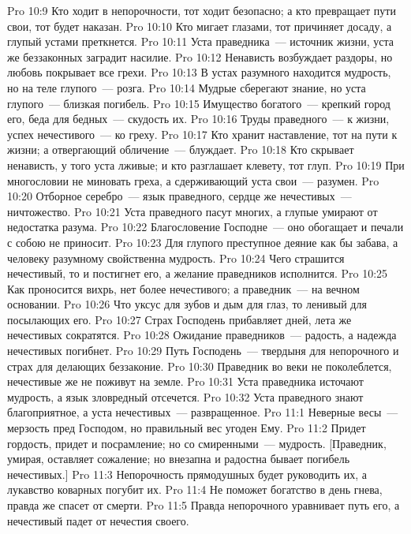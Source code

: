 \vs Pro 10:9 Кто ходит в непорочности, тот ходит безопасно; а кто превращает пути свои, тот будет наказан.
\vs Pro 10:10 Кто мигает глазами, тот причиняет досаду, а глупый устами преткнется.
\vs Pro 10:11 Уста праведника~--- источник жизни, уста же беззаконных заградит насилие.
\vs Pro 10:12 Ненависть возбуждает раздоры, но любовь покрывает все грехи.
\vs Pro 10:13 В устах разумного находится мудрость, но на теле глупого~--- розга.
\vs Pro 10:14 Мудрые сберегают знание, но уста глупого~--- близкая погибель.
\vs Pro 10:15 Имущество богатого~--- крепкий город его, беда для бедных~--- скудость их.
\vs Pro 10:16 Труды праведного~--- к жизни, успех нечестивого~--- ко греху.
\vs Pro 10:17 Кто хранит наставление, тот на пути к жизни; а отвергающий обличение~--- блуждает.
\vs Pro 10:18 Кто скрывает ненависть, у того уста лживые; и кто разглашает клевету, тот глуп.
\vs Pro 10:19 При многословии не миновать греха, а сдерживающий уста свои~--- разумен.
\vs Pro 10:20 Отборное серебро~--- язык праведного, сердце же нечестивых~--- ничтожество.
\vs Pro 10:21 Уста праведного пасут многих, а глупые умирают от недостатка разума.
\vs Pro 10:22 Благословение Господне~--- оно обогащает и печали с собою не приносит.
\vs Pro 10:23 Для глупого преступное деяние как бы забава, а человеку разумному свойственна мудрость.
\vs Pro 10:24 Чего страшится нечестивый, то и постигнет его, а желание праведников исполнится.
\vs Pro 10:25 Как проносится вихрь,  нет более нечестивого; а праведник~--- на вечном основании.
\vs Pro 10:26 Что уксус для зубов и дым для глаз, то ленивый для посылающих его.
\vs Pro 10:27 Страх Господень прибавляет дней, лета же нечестивых сократятся.
\vs Pro 10:28 Ожидание праведников~--- радость, а надежда нечестивых погибнет.
\vs Pro 10:29 Путь Господень~--- твердыня для непорочного и страх для делающих беззаконие.
\vs Pro 10:30 Праведник во веки не поколеблется, нечестивые же не поживут на земле.
\vs Pro 10:31 Уста праведника источают мудрость, а язык зловредный отсечется.
\vs Pro 10:32 Уста праведного знают благоприятное, а уста нечестивых~--- развращенное.
\vs Pro 11:1 Неверные весы~--- мерзость пред Господом, но правильный вес угоден Ему.
\vs Pro 11:2 Придет гордость, придет и посрамление; но со смиренными~--- мудрость. [Праведник, умирая, оставляет сожаление; но внезапна и радостна бывает погибель нечестивых.]
\vs Pro 11:3 Непорочность прямодушных будет руководить их, а лукавство коварных погубит их.
\vs Pro 11:4 Не поможет богатство в день гнева, правда же спасет от смерти.
\vs Pro 11:5 Правда непорочного уравнивает путь его, а нечестивый падет от нечестия своего.
